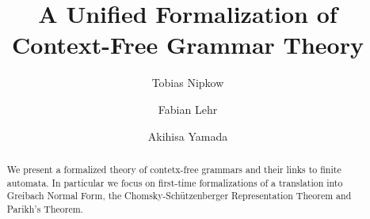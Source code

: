 \documentclass[runningheads]{llncs}
\begin{document}
\title{A Unified Formalization of Context-Free Grammar Theory}

\author{Tobias Nipkow \and
Fabian Lehr \and
Akihisa Yamada}
%


\maketitle

\begin{abstract}
We present a formalized theory of contetx-free grammars and
their links to finite automata. In particular we focus on first-time
formalizations of a translation into Greibach Normal Form, the Chomsky-Sch\"utzenberger Representation Theorem and Parikh's Theorem.

\end{abstract}


%





% 
% 
\end{document}
